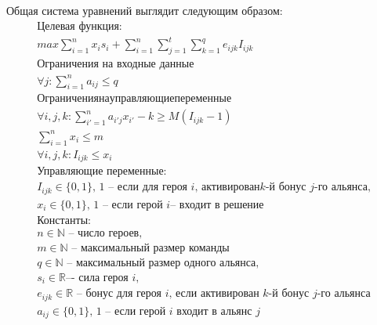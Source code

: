 \documentclass{article}
\begin{document}
 
Общая система уравнений выглядит следующим образом:
\begin{equation}
\begin{gathered}
\textbf{Целевая функция:}\\
max \sum_{i=1}^{n} x_i s_i + \sum_{i=1}^{n} \sum_{j=1}^{t}  \sum_{k=1}^{q} e_{ijk} I_{ijk} \\

\textbf{Ограничения на входные данные}\\
    
\forall{j} : \sum_{i=1}^n a_{ij} \le q \\

Ограничения на управляющие переменные \\
\forall{i,j,k} :  \sum_{i'=1}^{n} a_{i'j} x_{i'} - k \ge M( I_{ijk}  - 1) \\
\sum_{i=1}^n x_i \le m   \\ 


\forall{i,j,k} :  I_{ijk}  \le x_i \\


\text{Управляющие переменные:} \\
I_{ijk} \in \{0, 1\} \text {, 1 – если для героя } i \text{, активирован} k\text{-й бонус } j \text{-го альянса,} \\
x_i  \in \{0, 1\} \text{, 1 -- если герой } i \text{– входит в решение} \\

\textbf{Константы:} \\
n \in \mathbb{N} \text{ -- число героев,} \\
m \in \mathbb{N} \text{ -- максимальный размер команды}\\
q \in \mathbb{N} \text{ -- максимальный размер одного альянса,} \\

s_i  \in \mathbb{R} \text{–- сила героя } i, \\
e_{ijk} \in \mathbb{R} \text{ -- бонус для героя } i \text{,  если активирован } k
\text{-й бонус } j \text{-го альянса} \\
a_{ij} \in \{0, 1\} \text{, 1 -- если герой } i \text{ входит в альянс } j \\ 
\end{gathered}
\end{equation}
\end{document}
